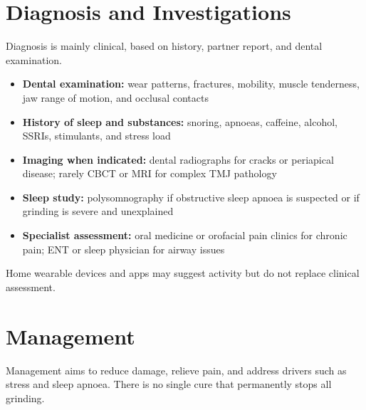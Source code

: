 \section*{Diagnosis and Investigations}
Diagnosis is mainly clinical, based on history, partner report, and dental examination.

\begin{itemize}
    \item \textbf{Dental examination:} wear patterns, fractures, mobility, muscle tenderness, jaw range of motion, and occlusal contacts
    \item \textbf{History of sleep and substances:} snoring, apnoeas, caffeine, alcohol, SSRIs, stimulants, and stress load
    \item \textbf{Imaging when indicated:} dental radiographs for cracks or periapical disease; rarely CBCT or MRI for complex TMJ pathology
    \item \textbf{Sleep study:} polysomnography if obstructive sleep apnoea is suspected or if grinding is severe and unexplained
    \item \textbf{Specialist assessment:} oral medicine or orofacial pain clinics for chronic pain; ENT or sleep physician for airway issues
\end{itemize}

Home wearable devices and apps may suggest activity but do not replace clinical assessment.

\section*{Management}
Management aims to reduce damage, relieve pain, and address drivers such as stress and sleep apnoea. There is no single cure that permanently stops all grinding.


